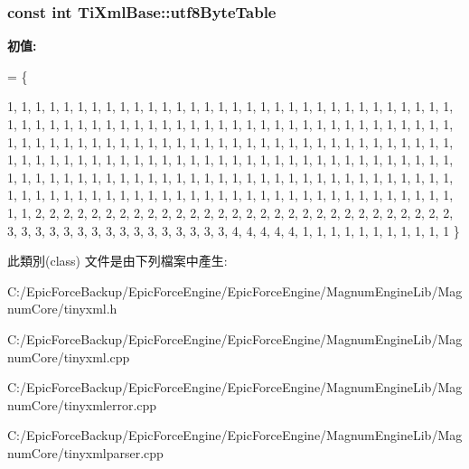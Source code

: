 \subsubsection[{\texorpdfstring{utf8\+Byte\+Table}{utf8ByteTable}}]{\setlength{\rightskip}{0pt plus 5cm}const int Ti\+Xml\+Base\+::utf8\+Byte\+Table\hspace{0.3cm}{\ttfamily [static]}}\hypertarget{class_ti_xml_base_ac8c86058137bdb4b413c3eca58f2d467}{}\label{class_ti_xml_base_ac8c86058137bdb4b413c3eca58f2d467}
{\bfseries 初值\+:}
\begin{DoxyCode}
= 
\{
    
        1,  1,  1,  1,  1,  1,  1,  1,  1,  1,  1,  1,  1,  1,  1,  1,  
        1,  1,  1,  1,  1,  1,  1,  1,  1,  1,  1,  1,  1,  1,  1,  1,  
        1,  1,  1,  1,  1,  1,  1,  1,  1,  1,  1,  1,  1,  1,  1,  1,  
        1,  1,  1,  1,  1,  1,  1,  1,  1,  1,  1,  1,  1,  1,  1,  1,  
        1,  1,  1,  1,  1,  1,  1,  1,  1,  1,  1,  1,  1,  1,  1,  1,  
        1,  1,  1,  1,  1,  1,  1,  1,  1,  1,  1,  1,  1,  1,  1,  1,  
        1,  1,  1,  1,  1,  1,  1,  1,  1,  1,  1,  1,  1,  1,  1,  1,  
        1,  1,  1,  1,  1,  1,  1,  1,  1,  1,  1,  1,  1,  1,  1,  1,  
        1,  1,  1,  1,  1,  1,  1,  1,  1,  1,  1,  1,  1,  1,  1,  1,  
        1,  1,  1,  1,  1,  1,  1,  1,  1,  1,  1,  1,  1,  1,  1,  1,  
        1,  1,  1,  1,  1,  1,  1,  1,  1,  1,  1,  1,  1,  1,  1,  1,  
        1,  1,  1,  1,  1,  1,  1,  1,  1,  1,  1,  1,  1,  1,  1,  1,  
        1,  1,  2,  2,  2,  2,  2,  2,  2,  2,  2,  2,  2,  2,  2,  2,  
        2,  2,  2,  2,  2,  2,  2,  2,  2,  2,  2,  2,  2,  2,  2,  2,  
        3,  3,  3,  3,  3,  3,  3,  3,  3,  3,  3,  3,  3,  3,  3,  3,  
        4,  4,  4,  4,  4,  1,  1,  1,  1,  1,  1,  1,  1,  1,  1,  1   
\}
\end{DoxyCode}


此類別(class) 文件是由下列檔案中產生\+:\begin{DoxyCompactItemize}
\item 
C\+:/\+Epic\+Force\+Backup/\+Epic\+Force\+Engine/\+Epic\+Force\+Engine/\+Magnum\+Engine\+Lib/\+Magnum\+Core/tinyxml.\+h\item 
C\+:/\+Epic\+Force\+Backup/\+Epic\+Force\+Engine/\+Epic\+Force\+Engine/\+Magnum\+Engine\+Lib/\+Magnum\+Core/tinyxml.\+cpp\item 
C\+:/\+Epic\+Force\+Backup/\+Epic\+Force\+Engine/\+Epic\+Force\+Engine/\+Magnum\+Engine\+Lib/\+Magnum\+Core/tinyxmlerror.\+cpp\item 
C\+:/\+Epic\+Force\+Backup/\+Epic\+Force\+Engine/\+Epic\+Force\+Engine/\+Magnum\+Engine\+Lib/\+Magnum\+Core/tinyxmlparser.\+cpp\end{DoxyCompactItemize}
